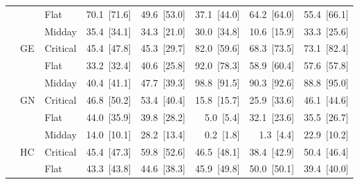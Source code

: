\begin{tabular}{l l l r r r r r}
 &  & Flat & 70.1~{\color{seasoncol}\scriptsize[71.6]} & 49.6~{\color{seasoncol}\scriptsize[53.0]} & 37.1~{\color{seasoncol}\scriptsize[44.0]} & 64.2~{\color{seasoncol}\scriptsize[64.0]} & 55.4~{\color{seasoncol}\scriptsize[66.1]} \\
 &  & Midday & 35.4~{\color{seasoncol}\scriptsize[34.1]} & 34.3~{\color{seasoncol}\scriptsize[21.0]} & 30.0~{\color{seasoncol}\scriptsize[34.8]} & 10.6~{\color{seasoncol}\scriptsize[15.9]} & 33.3~{\color{seasoncol}\scriptsize[25.6]} \\
 & GE & Critical & 45.4~{\color{seasoncol}\scriptsize[47.8]} & 45.3~{\color{seasoncol}\scriptsize[29.7]} & 82.0~{\color{seasoncol}\scriptsize[59.6]} & 68.3~{\color{seasoncol}\scriptsize[73.5]} & 73.1~{\color{seasoncol}\scriptsize[82.4]} \\
 &  & Flat & 33.2~{\color{seasoncol}\scriptsize[32.4]} & 40.6~{\color{seasoncol}\scriptsize[25.8]} & 92.0~{\color{seasoncol}\scriptsize[78.3]} & 58.9~{\color{seasoncol}\scriptsize[60.4]} & 57.6~{\color{seasoncol}\scriptsize[57.8]} \\
 &  & Midday & 40.4~{\color{seasoncol}\scriptsize[41.1]} & 47.7~{\color{seasoncol}\scriptsize[39.3]} & 98.8~{\color{seasoncol}\scriptsize[91.5]} & 90.3~{\color{seasoncol}\scriptsize[92.6]} & 88.8~{\color{seasoncol}\scriptsize[95.0]} \\
 & GN & Critical & 46.8~{\color{seasoncol}\scriptsize[50.2]} & 53.4~{\color{seasoncol}\scriptsize[40.4]} & 15.8~{\color{seasoncol}\scriptsize[15.7]} & 25.9~{\color{seasoncol}\scriptsize[33.6]} & 46.1~{\color{seasoncol}\scriptsize[44.6]} \\
 &  & Flat & 44.0~{\color{seasoncol}\scriptsize[35.9]} & 39.8~{\color{seasoncol}\scriptsize[28.2]} & 5.0~{\color{seasoncol}\scriptsize[5.4]} & 32.1~{\color{seasoncol}\scriptsize[23.6]} & 35.5~{\color{seasoncol}\scriptsize[26.7]} \\
 &  & Midday & 14.0~{\color{seasoncol}\scriptsize[10.1]} & 28.2~{\color{seasoncol}\scriptsize[13.4]} & 0.2~{\color{seasoncol}\scriptsize[1.8]} & 1.3~{\color{seasoncol}\scriptsize[4.4]} & 22.9~{\color{seasoncol}\scriptsize[10.2]} \\
 & HC & Critical & 45.4~{\color{seasoncol}\scriptsize[47.3]} & 59.8~{\color{seasoncol}\scriptsize[52.6]} & 46.5~{\color{seasoncol}\scriptsize[48.1]} & 38.4~{\color{seasoncol}\scriptsize[42.9]} & 50.4~{\color{seasoncol}\scriptsize[46.4]} \\
 &  & Flat & 43.3~{\color{seasoncol}\scriptsize[43.8]} & 44.6~{\color{seasoncol}\scriptsize[38.3]} & 45.9~{\color{seasoncol}\scriptsize[49.8]} & 50.0~{\color{seasoncol}\scriptsize[50.1]} & 39.4~{\color{seasoncol}\scriptsize[40.0]} \\

\end{tabular}
